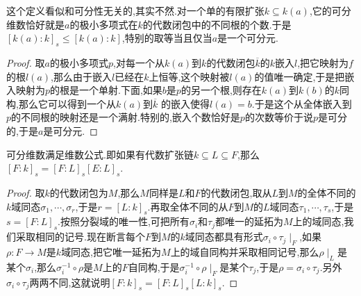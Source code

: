 这个定义看似和可分性无关的,其实不然.对一个单的有限扩张$k\subseteq k(a)$,它的可分维数恰好就是$a$的极小多项式在$k$的代数闭包中的不同根的个数.于是$[k(a):k]_s\le[k(a):k]$,特别的取等当且仅当$a$是一个可分元.
\begin{proof}

取$a$的极小多项式$p$,对每一个从$k(a)$到$k$的代数闭包$\overline{k}$的$k$嵌入$l$,把它映射为$f$的根$l(a)$,那么由于嵌入$l$已经在$k$上恒等,这个映射被$l(a)$的值唯一确定,于是把嵌入映射为$p$的根是一个单射.下面,如果$b$是$p$的另一个根,则存在$k(a)$到$k(b)$的$k$同构,那么它可以得到一个从$k(a)$到$\overline{k}$ 的嵌入使得$l(a)=b$.于是这个从全体嵌入到$p$的不同根的映射还是一个满射.特别的,嵌入个数恰好是$p$的次数等价于说$p$是可分的,于是$a$是可分元.
\end{proof}

可分维数满足维数公式.即如果有代数扩张链$k\subseteq L\subseteq F$,那么$[F:k]_s=[F:L]_s[E:L]_s$.
\begin{proof}

取$k$的代数闭包为$M$,那么$M$同样是$L$和$F$的代数闭包,取从$L$到$M$的全体不同的$k$域同态$\sigma_1,\cdots,\sigma_r$,于是$r=[L:k]_s$.再取全体不同的从$F$到$M$的$L$域同态$\tau_1,\cdots,\tau_s$,于是$s=[F:L]_s$.按照分裂域的唯一性,可把所有$\sigma_i$和$\tau_j$都唯一的延拓为$M$上的域同态,我们采取相同的记号.现在断言每个$F$到$M$的$k$域同态都具有形式$\sigma_i\circ\tau_j\mid_F$,如果$\rho:F\to M$是$k$域同态,把它唯一延拓为$M$上的域自同构并采取相同记号,那么$\rho\mid_L$是某个$\sigma_i$,那么$\sigma_i^{-1}\circ\rho$是$M$上的$F$自同构,于是$\sigma_i^{-1}\circ\rho\mid_F$是某个$\tau_j$,于是$\rho=\sigma_i\circ\tau_j$.另外$\sigma_i\circ\tau_j$两两不同,这就说明$[F:k]_s=[F:L]_s[L:k]_s$.
\end{proof}

